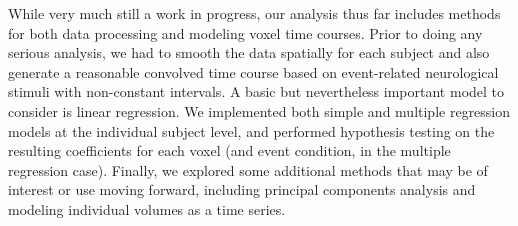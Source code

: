 \par \indent While very much still a work in progress, our analysis thus far includes methods for both data processing and modeling voxel time courses. Prior to doing any serious analysis, we had to smooth the data spatially for each subject and also generate a reasonable convolved time course based on event-related neurological stimuli with non-constant intervals. A basic but nevertheless important model to consider is linear regression. We implemented both simple and multiple regression models at the individual subject level, and performed hypothesis testing on the resulting coefficients for each voxel (and event condition, in the multiple regression case). Finally, we explored some additional methods that may be of interest or use moving forward, including principal components analysis and modeling individual volumes as a time series. 
